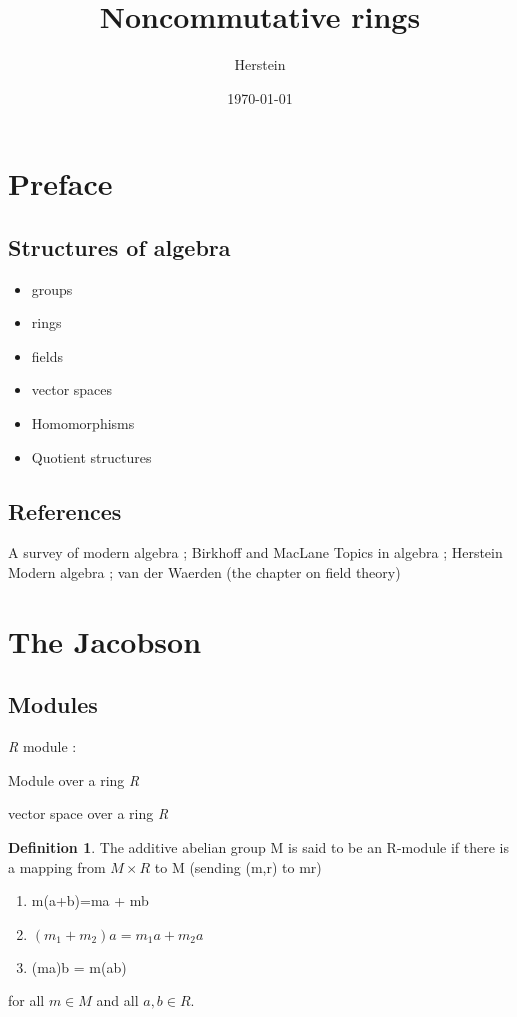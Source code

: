 \documentclass{article}
\theoremstyle{definition}
\newtheorem{definition}{Definition}[section]
\begin{document}
\title{Noncommutative rings}
\author{Herstein}
\date{\today}
\maketitle

\section{Preface}

\subsection{Structures of algebra}

\begin{itemize}
  \item groups
  \item rings
  \item fields
  \item vector spaces
  \item Homomorphisms
  \item Quotient structures
\end{itemize}

\subsection{References}
A survey of modern algebra ; Birkhoff and MacLane \newline
Topics in algebra ; Herstein \newline
Modern algebra ; van der Waerden (the chapter on field theory)

\section{The Jacobson}

\subsection{Modules}

\textit{R} module : 

Module over a ring \textit{R} 

vector space over a ring \textit{R}

\begin{definition}
  The additive abelian group M is said to be an R-module if there is a mapping from $M\times R$ to M (sending (m,r) to mr)
  \begin{enumerate}
    \item m(a+b)=ma + mb
    \item $(m_1 + m_2)a = m_1 a + m_2 a$
    \item (ma)b = m(ab)
  \end{enumerate}
  for all $m \in M$ and all $a, b \in R$.
\end{definition}
\end{document}
